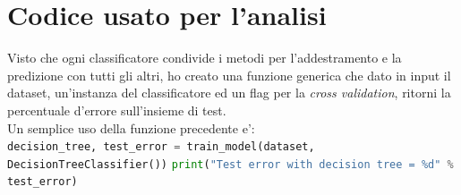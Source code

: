 \section{Codice usato per l'analisi}

Visto che ogni classificatore condivide i metodi per l'addestramento e la predizione con tutti gli altri, ho creato una funzione generica che  dato in input il dataset, un'instanza del classificatore ed un flag per la \textit{cross validation}, ritorni la percentuale d'errore sull'insieme di test.\\
Un semplice uso della funzione precedente e':\\
	\noindent
	\lstinline[language=Python]|decision_tree, test_error = train_model(dataset, DecisionTreeClassifier())|
	\lstinline[language=Python]|print("Test error with decision tree = %d" % test_error)|
